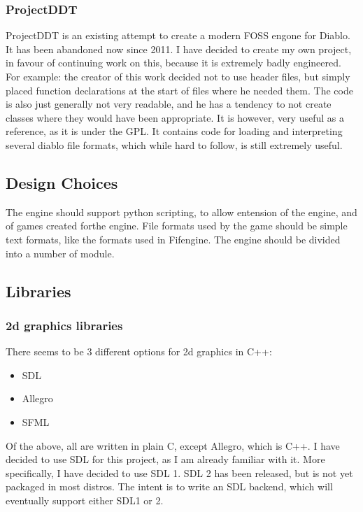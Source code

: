 \documentclass[a4paper]{article}
\begin{document}
    	\subsubsection{ProjectDDT}
    	ProjectDDT\cite{ddt} is an existing attempt to create a modern FOSS engone for Diablo.
    	It has been abandoned now since 2011.
    	I have decided to create my own project, in favour of continuing work on this, because it is extremely badly engineered.
    	For example: the creator of this work decided not to use header files, but simply placed function declarations at the start of files where he needed them.
    	The code is also just generally not very readable, and he has a tendency to not create classes where they would have been appropriate.
    	It is however, very useful as a reference, as it is under the GPL.
    	It contains code for loading and interpreting several diablo file formats, which while hard to follow, is still extremely useful.
    
    \subsection{Design Choices}
    The engine should support python scripting, to allow entension of the engine, and of games created forthe engine.
    File formats used by the game should be simple text formats, like the formats used in Fifengine.
    The engine should be divided into a number of module.
    
    \newpage
    
    \subsection{Libraries}
        \subsubsection{2d graphics libraries}
    	There seems to be 3 different options for 2d graphics in C++:
    	\begin{itemize}
    	    \item{SDL}
    	    \item{Allegro}
    	    \item{SFML}
    	\end{itemize}
    	
    	Of the above, all are written in plain C, except Allegro, which is C++.
    	I have decided to use SDL for this project, as I am already familiar with it.
    	More specifically, I have decided to use SDL 1.
    	SDL 2 has been released, but is not yet packaged in most distros. 
    	The intent is to write an SDL backend, which will eventually support either SDL1 or 2.
    	
\end{document}
